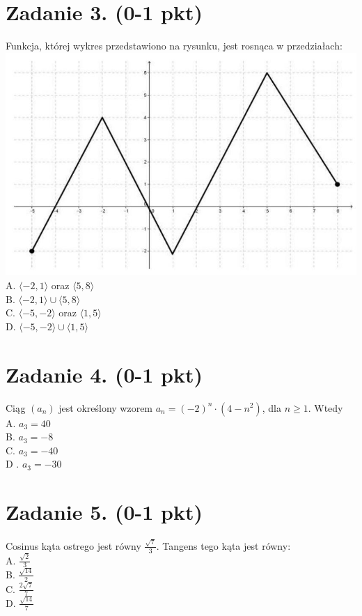 \documentclass[10pt]{article}
\begin{document}
\section*{Zadanie 3. (0-1 pkt)}
Funkcja, której wykres przedstawiono na rysunku, jest rosnąca w przedziałach:\\
\includegraphics[max width=\textwidth, center]{2024_11_21_b8ac5f500a5bbb1b4ec5g-02}\\
A. \(\langle-2,1\rangle\) oraz \(\langle 5,8\rangle\)\\
B. \(\langle-2,1\rangle \cup\langle 5,8\rangle\)\\
C. \(\langle-5,-2\rangle\) oraz \(\langle 1,5\rangle\)\\
D. \(\langle-5,-2\rangle \cup\langle 1,5\rangle\)

\section*{Zadanie 4. (0-1 pkt)}
Ciąg \(\left(a_{n}\right)\) jest określony wzorem \(a_{n}=(-2)^{n} \cdot\left(4-n^{2}\right)\), dla \(n \geq 1\). Wtedy\\
A. \(a_{3}=40\)\\
B. \(a_{3}=-8\)\\
C. \(a_{3}=-40\)\\
D . \(a_{3}=-30\)

\section*{Zadanie 5. (0-1 pkt)}
Cosinus kąta ostrego jest równy \(\frac{\sqrt{7}}{3}\). Tangens tego kąta jest równy:\\
A. \(\frac{\sqrt{2}}{3}\)\\
B. \(\frac{\sqrt{14}}{2}\)\\
C. \(\frac{2 \sqrt{7}}{7}\)\\
D. \(\frac{\sqrt{14}}{7}\)
\end{document}
